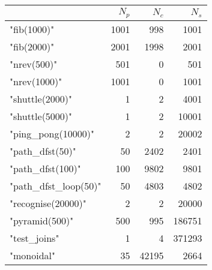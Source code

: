 \begin{tabular}{@{}lrrr@{}}
 & $N_p$ & $N_c$ & $N_s$\\
\hline{"fib(1000)"} & 1001 & 998 & 1001\\
{"fib(2000)"} & 2001 & 1998 & 2001\\
{"nrev(500)"} & 501 & 0 & 501\\
{"nrev(1000)"} & 1001 & 0 & 1001\\
{"shuttle(2000)"} & 1 & 2 & 4001\\
{"shuttle(5000)"} & 1 & 2 & 10001\\
{"ping_pong(10000)"} & 2 & 2 & 20002\\
{"path_dfst(50)"} & 50 & 2402 & 2401\\
{"path_dfst(100)"} & 100 & 9802 & 9801\\
{"path_dfst_loop(50)"} & 50 & 4803 & 4802\\
{"recognise(20000)"} & 2 & 2 & 20000\\
{"pyramid(500)"} & 500 & 995 & 186751\\
{"test_joins"} & 1 & 4 & 371293\\
{"monoidal"} & 35 & 42195 & 2664\\
\hline\end{tabular}
